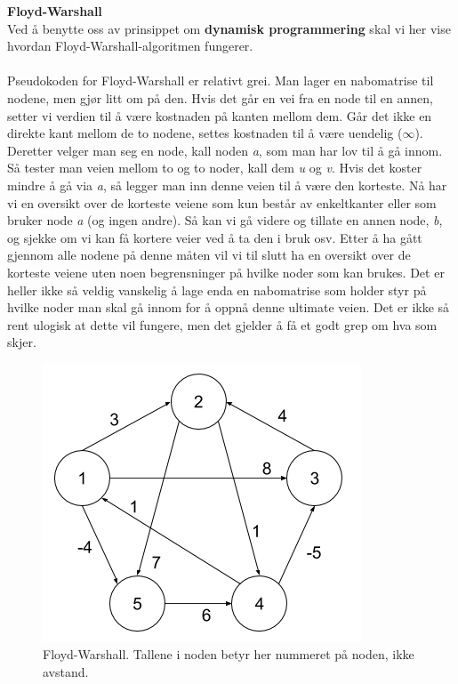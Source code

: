 \noindent\textbf{Floyd-Warshall}\\
Ved å benytte oss av prinsippet om \textbf{dynamisk programmering} skal vi her vise hvordan Floyd-Warshall-algoritmen fungerer.
\\\\
Pseudokoden for Floyd-Warshall er relativt grei. Man lager en nabomatrise til nodene, men gjør litt om på den. Hvis det går en vei fra en node til en annen, setter vi verdien til å være kostnaden på kanten mellom dem. Går det ikke en direkte kant mellom de to nodene, settes kostnaden til å være uendelig ($\infty$). Deretter velger man seg en node, kall noden \textit{a}, som man har lov til å gå innom. Så tester man veien mellom to og to noder, kall dem \textit{u} og \textit{v}. Hvis det koster mindre å gå via \textit{a}, så legger man inn denne veien til å være den korteste. Nå har vi en oversikt over de korteste veiene som kun består av enkeltkanter eller som bruker node \textit{a} (og ingen andre). Så kan vi gå videre og tillate en annen node, \textit{b}, og sjekke om vi kan få kortere veier ved å ta den i bruk osv. Etter å ha gått gjennom alle nodene på denne måten vil vi til slutt ha en oversikt over de korteste veiene uten noen begrensninger på hvilke noder som kan brukes. Det er heller ikke så veldig vanskelig å lage enda en nabomatrise som holder styr på hvilke noder man skal gå innom for å oppnå denne ultimate veien. Det er ikke så rent ulogisk at dette vil fungere, men det gjelder å få et godt grep om hva som skjer.


\begin{figure}[H]
\includegraphics[scale=0.5]{images/floyd-warshall}
\centering %
\caption{Floyd-Warshall. Tallene i noden betyr her nummeret på noden, ikke avstand.}
\label{fig:floyd-warshall}
\end{figure}


